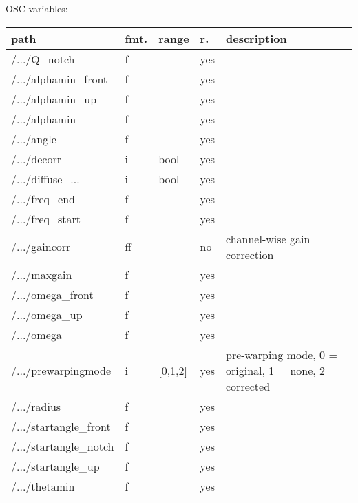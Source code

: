 \begin{snugshade}
{\footnotesize
\label{osctab:receivermodhrtf}
OSC variables:
\nopagebreak

\begin{tabularx}{\textwidth}{llllX}
\hline
path & fmt. & range & r. & description\\
\hline
/.../Q\_notch & f &  & yes & \\
/.../alphamin\_front & f &  & yes & \\
/.../alphamin\_up & f &  & yes & \\
/.../alphamin & f &  & yes & \\
/.../angle & f &  & yes & \\
/.../decorr & i & bool & yes & \\
/.../diffuse\_... & i & bool & yes & \\
/.../freq\_end & f &  & yes & \\
/.../freq\_start & f &  & yes & \\
/.../gaincorr & ff &  & no & channel-wise gain correction\\
/.../maxgain & f &  & yes & \\
/.../omega\_front & f &  & yes & \\
/.../omega\_up & f &  & yes & \\
/.../omega & f &  & yes & \\
/.../prewarpingmode & i & [0,1,2] & yes & pre-warping mode, 0 = original, 1 = none, 2 = corrected\\
/.../radius & f &  & yes & \\
/.../startangle\_front & f &  & yes & \\
/.../startangle\_notch & f &  & yes & \\
/.../startangle\_up & f &  & yes & \\
/.../thetamin & f &  & yes & \\
\hline
\end{tabularx}
}
\end{snugshade}
